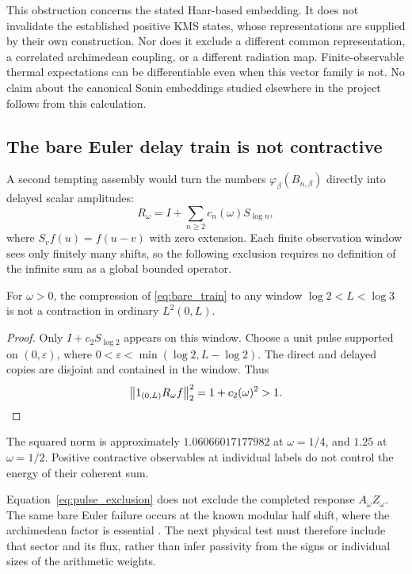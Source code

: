 This obstruction concerns the stated Haar-based embedding. It does not
invalidate the established positive KMS states, whose representations
are supplied by their own construction. Nor does it exclude a
different common representation, a correlated archimedean coupling,
or a different radiation map. Finite-observable thermal expectations
can be differentiable even when this vector family is not. No claim
about the canonical Sonin embeddings studied elsewhere in the project
follows from this calculation.

\subsection{The bare Euler delay train is not contractive}

A second tempting assembly would turn the numbers
$\varphi_\beta(B_{n,\beta})$ directly into delayed scalar amplitudes:
\begin{equation}
 R_\omega=I+\sum_{n\ge2}c_n(\omega)S_{\log n},
 \label{eq:bare_train}
\end{equation}
where $S_vf(u)=f(u-v)$ with zero extension. Each finite observation
window sees only finitely many shifts, so the following exclusion
requires no definition of the infinite sum as a global bounded operator.

\begin{proposition}
For $\omega>0$, the compression of \eqref{eq:bare_train} to any
window $\log2<L<\log3$ is not a contraction in ordinary $L^2(0,L)$.
\end{proposition}

\begin{proof}
Only $I+c_2S_{\log2}$ appears on this window. Choose a unit pulse
supported on $(0,\varepsilon)$, where
$0<\varepsilon<\min(\log2,L-\log2)$. The direct and delayed copies
are disjoint and contained in the window. Thus
\begin{equation}
 \left\lVert1_{(0,L)}R_\omega f\right\rVert_2^2=1+c_2(\omega)^2>1.
 \label{eq:pulse_exclusion}
\end{equation}
\end{proof}

The squared norm is approximately $1.06066017177982$ at
$\omega=1/4$, and $1.25$ at $\omega=1/2$. Positive contractive
observables at individual labels do not control the energy of their
coherent sum.

Equation~\eqref{eq:pulse_exclusion} does not exclude the completed
response $A_\omega Z_\omega$. The same bare Euler failure occurs at
the known modular half shift, where the archimedean factor is essential
\cite{ModularNote}. The next physical test must therefore include that
sector and its flux, rather than infer passivity from the signs or
individual sizes of the arithmetic weights.
